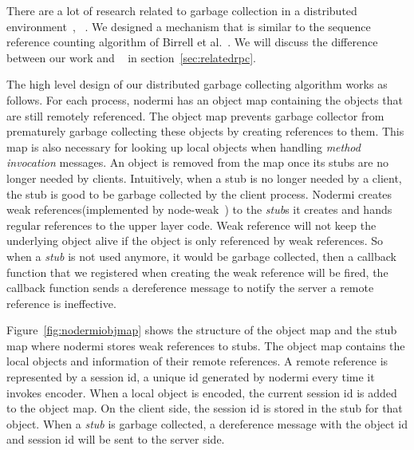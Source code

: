 There are a lot of research related to garbage collection in a distributed
environment~\cite{abdullahi1998garbage}, ~\cite{birrell1993distributed}.
We designed a mechanism that is similar to the sequence reference counting algorithm
of Birrell et al.~\cite{birrell1993distributed}.
We will discuss the difference between our work and ~\cite{birrell1993distributed}
in section~\ref{sec:relatedrpc}.

The high level design of our distributed garbage collecting 
algorithm works as follows.
For each process, nodermi has an object map containing the objects 
that are still remotely referenced.
The object map prevents garbage collector from prematurely garbage collecting
these objects by creating references to them.
This map is also necessary for looking up local objects 
when handling \emph{method invocation} messages.
An object is removed from the map once its stubs
are no longer needed by clients.
Intuitively,
when a stub is no longer needed by a client,
the stub is good to be garbage collected by the client process.
Nodermi creates weak references(implemented by node-weak~\cite{nodeweak}) 
to the \emph{stub}s it creates
and hands regular references to the upper layer code.
Weak reference will not keep the underlying object alive
if the object is only referenced by weak references.
So when a \emph{stub} is not used anymore,
it would be garbage collected,
then a callback function that we registered when creating the weak
reference will be fired,
the callback function sends a dereference message to notify the server
a remote reference is ineffective.


\nodrmiobjmapfig{}

Figure~\ref{fig:nodermiobjmap} shows the structure of
the object map and the stub map where nodermi stores weak references to stubs.
The object map contains the local objects and information of
their remote references.
A remote reference is represented by a session id,
a unique id generated by nodermi every time it invokes encoder.
When a local object is encoded, the current session id is added to 
the object map.
On the client side, the session id is stored in the stub for that object.
When a \emph{stub} is garbage collected,
a dereference message with the object id and session id will 
be sent to the server side.


\nodrmiracefig{}


